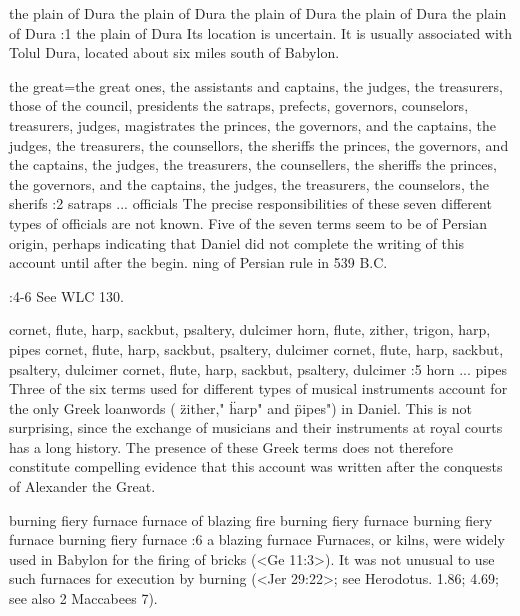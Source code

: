     {the plain of Dura} %
    {the plain of Dura} %
    {the plain of Dura} %
    {the plain of Dura} %
    {the plain of Dura} %
:1 {the plain of Dura} Its location is uncertain. It is usually associated with 
Tolul Dura, located about six miles south of Babylon.


    {the great}={the great ones, the assistants and captains, the judges, the treasurers, those of the council, presidents} %
    {the satraps, prefects, governors, counselors, treasurers, judges, magistrates} %
    {the princes, the governors, and the captains, the judges, the treasurers, the counsellors, the sheriffs} %
    {the princes, the governors, and the captains, the judges, the treasurers, the counsellers, the sheriffs} %
    {the princes, the governors, and the captains, the judges, the treasurers, the counselors, the sherifs} %
:2 {satraps ... officials} The precise responsibilities of these seven different types of officials
are not known. Five of the seven  terms seem to be of Persian origin, perhaps indicating that Daniel 
did not complete the writing of this account until after the begin. 
ning of Persian rule in 539 B.C.

:4-6 {}  See WLC 130.

    {cornet, flute, harp, sackbut, psaltery, dulcimer} %
    {horn, flute, zither, trigon, harp, pipes} %
    {cornet, flute, harp, sackbut, psaltery, dulcimer} %
    {cornet, flute, harp, sackbut, psaltery, dulcimer} %
    {cornet, flute, harp, sackbut, psaltery, dulcimer} %
:5 {horn ... pipes} Three of the six terms used for different types 
of musical instruments account for the only Greek loanwords 
( \"zither," \"harp" and \"pipes") in Daniel. This is not surprising, since 
the exchange of musicians and their instruments at royal courts 
has a long history. The presence of these Greek terms does not 
therefore constitute compelling evidence that this account was 
written after the conquests of Alexander the Great.

    {burning fiery furnace} %
    {furnace of blazing fire} %
    {burning fiery furnace} %
    {burning fiery furnace} %
    {burning fiery furnace} %
:6 {a blazing furnace} Furnaces, or kilns, were widely used in 
Babylon for the firing of bricks (<Ge 11:3>). It was not unusual to use 
such furnaces for execution by burning (<Jer 29:22>; see Herodotus. 
1.86; 4.69; see also 2 Maccabees 7).

